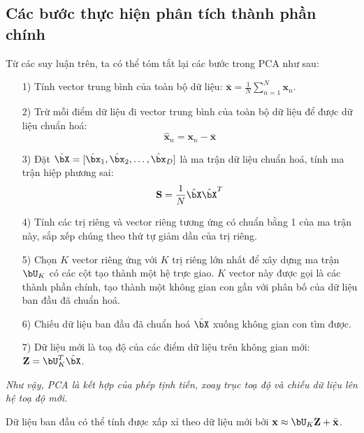 \subsection{Các bước thực hiện phân tích thành phần chính}
	Từ các suy luận trên, ta có thể tóm tắt lại các bước trong PCA như sau:
	\begin{itemize}
		\item[1)] Tính vector trung bình của toàn bộ dữ liệu:
		\begin{math}
		\bar{\mathbf{x}} = \frac{1}{N} \sum_{n=1}^N \mathbf{x}_n
		\end{math}.
		\item[2)] Trừ mỗi điểm dữ liệu đi vector trung bình của toàn bộ dữ liệu để được dữ
		liệu chuẩn hoá:
		\begin{equation}
		\hat{\mathbf{x}}_n = \mathbf{x}_n - \bar{\mathbf{x}}
		\end{equation}
		\item[3)] Đặt $\hat{\bX} = [\hat{\bx}_1, \hat{\bx}_2, \dots,
		\hat{\bx}_D]$ là ma trận dữ liệu chuẩn hoá, tính ma trận hiệp phương sai:
		\begin{equation}
		\mathbf{S} = \frac{1}{N}\hat{\bX}\hat{\bX}^T
		\end{equation}
		\item[4)] Tính các trị riêng và vector riêng tương ứng có chuẩn bằng 1 của ma trận này, sắp xếp chúng theo thứ tự giảm dần của trị riêng.
		\item[5)] Chọn $K$ vector riêng ứng với $K$ trị riêng lớn nhất để xây dựng ma trận $\bU_K$ có các cột tạo thành một hệ trực giao. $K$ vector này được gọi là các thành phần chính, tạo thành một không gian con {gần} với phân bố của dữ liệu ban đầu đã chuẩn hoá.
		\item[6)] Chiếu dữ liệu ban đầu đã chuẩn hoá $\hat{\bX}$ xuống không gian con tìm được.
		\item[7)] Dữ liệu mới là toạ độ của các điểm dữ liệu trên không gian mới:
		\begin{math}
		\mathbf{Z} = \bU_K^T\hat{\bX}
		\end{math}.
	\end{itemize}
	
	\textit{Như vậy, PCA là kết hợp của phép tịnh tiến, xoay trục toạ độ và chiếu dữ liệu lên hệ toạ độ mới.}
	
	Dữ liệu ban đầu có thể tính được xấp xỉ theo dữ liệu mới bởi
	\begin{math}
	\mathbf{x} \approx \bU_K\mathbf{Z} + \bar{\mathbf{x}}
	\end{math}.
	
